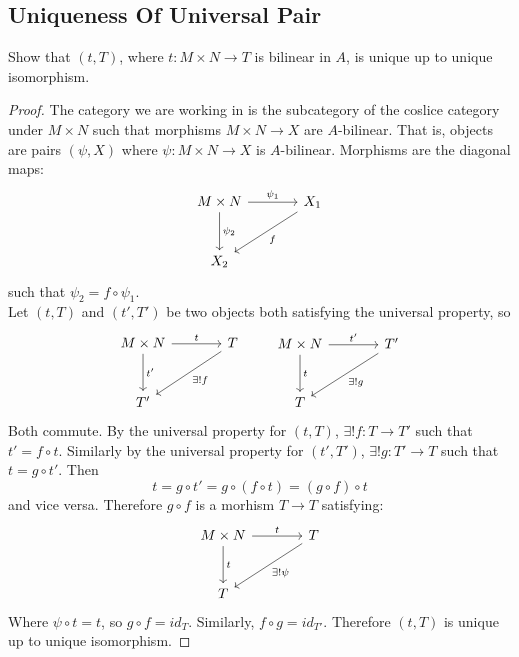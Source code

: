 \documentclass[hidelinks,12pt]{article}
\begin{document}
\subsection{Uniqueness Of Universal Pair}
Show that \((t,T)\), where \(t:M\times N\to T\) is bilinear in \(A\), is unique up to unique isomorphism.
\begin{proof}
The category we are working in is the subcategory of the coslice category under \(M\times N\) such that morphisms \(M\times N\to X\) are \(A\)-bilinear. That is, objects are pairs \((\psi,X)\) where \(\psi:M\times N\to X\) is \(A\)-bilinear. Morphisms are the diagonal maps:
\[
\begin{tikzcd}[row sep=large,column sep=large]
M\times N \arrow[r, "\psi_{1}"] \arrow[d, "\psi_{2}"] & X_{1} \arrow[dl, "f"] \\
X_{2} &
\end{tikzcd}
\]
such that \(\psi_{2}=f\circ\psi_{1}\).\\ Let \((t,T)\) and \((t',T')\) be two objects both satisfying the universal property, so \[
\begin{tikzcd}[row sep=large,column sep=large]
M\times N \arrow[r, "t"] \arrow[d, "t'"] & T \arrow[dl, "\exists !f"] \\
T' &
\end{tikzcd}
\qquad
\begin{tikzcd}[row sep=large,column sep=large]
M\times N \arrow[r, "t'"] \arrow[d, "t"] & T' \arrow[dl, "\exists !g"] \\
T &
\end{tikzcd}
\]
Both commute. By the universal property for \((t,T)\), \(\exists !f:T\to T'\) such that \(t'=f\circ t\). Similarly by the universal property for \((t',T')\), \(\exists !g:T'\to T\) such that \(t=g\circ t'\). Then \[
t=g\circ t'=g\circ(f\circ t)=(g\circ f)\circ t
\]
and vice versa. Therefore \(g\circ f\) is a morhism \(T\to T\) satisfying:
\[
\begin{tikzcd}[row sep=large,column sep=large]
M\times N \arrow[r, "t"] \arrow[d,"t"] & T \arrow[dl, "\exists !\psi"] \\
T &
\end{tikzcd}
\]
Where \(\psi\circ t=t\), so \(g\circ f=id_{T}\). Similarly, \(f\circ g=id_{T'}\). Therefore \((t,T)\) is unique up to unique isomorphism.
\end{proof}
\end{document}
